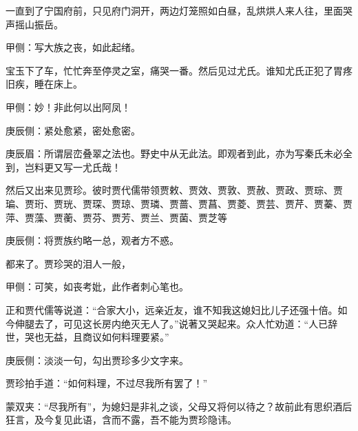 \begin{parag}
    一直到了宁国府前，只见府门洞开，两边灯笼照如白昼，乱烘烘人来人往，里面哭声摇山振岳。\begin{note}甲侧：写大族之丧，如此起绪。\end{note}宝玉下了车，忙忙奔至停灵之室，痛哭一番。然后见过尤氏。谁知尤氏正犯了胃疼旧疾，睡在床上。\begin{note}甲侧：妙！非此何以出阿凤！\end{note}\begin{note}庚辰侧：紧处愈紧，密处愈密。\end{note}\begin{note}庚辰眉：所谓层峦叠翠之法也。野史中从无此法。即观者到此，亦为写秦氏未必全到，岂料更又写一尤氏哉！\end{note}然后又出来见贾珍。彼时贾代儒带领贾敕、贾效、贾敦、贾赦、贾政、贾琮、贾㻞、贾珩、贾珖、贾琛、贾琼、贾璘、贾蔷、贾菖、贾菱、贾芸、贾芹、贾蓁、贾萍、贾藻、贾蘅、贾芬、贾芳、贾兰、贾菌、贾芝等\begin{note}庚辰侧：将贾族约略一总，观者方不惑。\end{note}都来了。贾珍哭的泪人一般，\begin{note}甲侧：可笑，如丧考妣，此作者刺心笔也。\end{note}正和贾代儒等说道：“合家大小，远亲近友，谁不知我这媳妇比儿子还强十倍。如今伸腿去了，可见这长房内绝灭无人了。”说著又哭起来。众人忙劝道：“人已辞世，哭也无益，且商议如何料理要紧。”\begin{note}庚辰侧：淡淡一句，勾出贾珍多少文字来。\end{note}贾珍拍手道：“如何料理，不过尽我所有罢了！”\begin{note}蒙双夹：“尽我所有”，为媳妇是非礼之谈，父母又将何以待之？故前此有思织酒后狂言，及今复见此语，含而不露，吾不能为贾珍隐讳。\end{note}
\end{parag}


